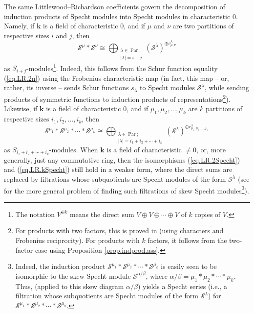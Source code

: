 \documentclass[numbers=enddot,12pt,final,onecolumn,notitlepage]{scrartcl}%
\theoremstyle{definition}
\begin{document}
The same Littlewood--Richardson coefficients govern the decomposition of
induction products of Specht modules into Specht modules in characteristic
$0$. Namely, if $\mathbf{k}$ is a field of characteristic $0$, and if $\mu$
and $\nu$ are two partitions of respective sizes $i$ and $j$, then%
\begin{equation}
\mathcal{S}^{\mu}\ast\mathcal{S}^{\nu}\cong\bigoplus_{\substack{\lambda
\in\operatorname*{Par};\\\left\vert \lambda\right\vert =i+j}}\left(
\mathcal{S}^{\lambda}\right)  ^{\oplus c_{\mu,\nu}^{\lambda}}
\label{eq.LR.2Specht}%
\end{equation}
as $S_{i+j}$-modules\footnote{The notation $V^{\oplus k}$ means the direct sum
$V\oplus V\oplus\cdots\oplus V$ of $k$ copies of $V$.}. Indeed, this follows
from the Schur function equality (\ref{eq.LR.2n}) using the Frobenius
characteristic map \cite[Theorem 4.7.4]{Sagan-SG} (in fact, this map -- or,
rather, its inverse -- sends Schur functions $s_{\lambda}$ to Specht modules
$\mathcal{S}^{\lambda}$, while sending products of symmetric functions to
induction products of representations\footnote{For products with two factors,
this is proved in \cite[Theorem 4.7.4]{Sagan-SG} (using characters and
Frobenius reciprocity). For products with $k$ factors, it follows from the
two-factor case using Proposition \ref{prop.indprod.ass}.}). Likewise, if
$\mathbf{k}$ is a field of characteristic $0$, and if $\mu_{1},\mu_{2}%
,\ldots,\mu_{k}$ are $k$ partitions of respective sizes $i_{1},i_{2}%
,\ldots,i_{k}$, then%
\begin{equation}
\mathcal{S}^{\mu_{1}}\ast\mathcal{S}^{\mu_{2}}\ast\cdots\ast\mathcal{S}%
^{\mu_{k}}\cong\bigoplus_{\substack{\lambda\in\operatorname*{Par};\\\left\vert
\lambda\right\vert =i_{1}+i_{2}+\cdots+i_{k}}}\left(  \mathcal{S}^{\lambda
}\right)  ^{\oplus c_{\mu_{1},\mu_{2},\ldots,\mu_{k}}^{\lambda}}
\label{eq.LR.kSpecht}%
\end{equation}
as $S_{i_{1}+i_{2}+\cdots+i_{k}}$-modules. When $\mathbf{k}$ is a field of
characteristic $\neq0$, or, more generally, just any commutative ring, then
the isomorphisms (\ref{eq.LR.2Specht}) and (\ref{eq.LR.kSpecht}) still hold in
a weaker form, where the direct sums are replaced by filtrations whose
subquotients are Specht modules of the form $\mathcal{S}^{\lambda}$ (see
\cite[Theorem 9.7]{Clausen91} for the more general problem of finding such
filtrations of skew Specht modules\footnote{Indeed, the induction product
$\mathcal{S}^{\mu_{1}}\ast\mathcal{S}^{\mu_{2}}\ast\cdots\ast\mathcal{S}%
^{\mu_{k}}$ is easily seen to be isomorphic to the skew Specht module
$\mathcal{S}^{\alpha/\beta}$, where $\alpha/\beta=\mu_{1}\ast\mu_{2}\ast
\cdots\ast\mu_{k}$. Thus, \cite[Theorem 9.7]{Clausen91} (applied to this skew
diagram $\alpha/\beta$) yields a Specht series (i.e., a filtration whose
subquotients are Specht modules of the form $\mathcal{S}^{\lambda}$) for
$\mathcal{S}^{\mu_{1}}\ast\mathcal{S}^{\mu_{2}}\ast\cdots\ast\mathcal{S}%
^{\mu_{k}}$.}).
\end{document}
